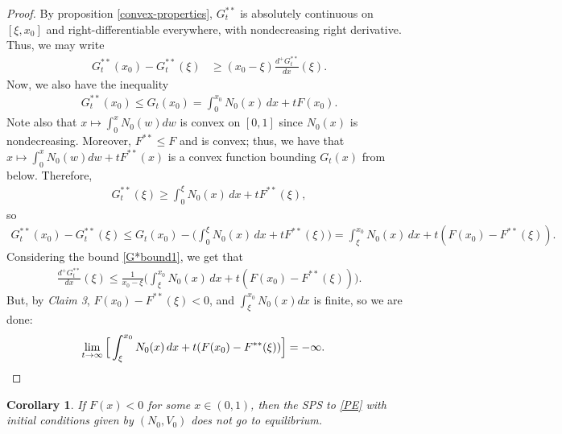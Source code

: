 \documentclass[11pt]{article}
\newtheorem{cor}[thm]{Corollary}
\numberwithin{equation}{section}
\begin{document}
\begin{proof}
    By proposition \ref{convex-properties}, $G_t^{**}$ is absolutely continuous on $[\xi,x_0]$ and right-differentiable everywhere, with nondecreasing right derivative. Thus, we may write
    \begin{align}%
        G_t^{**}(x_0)-G_t^{**}(\xi)&%
        \label{G*bound1}
        \geq%
        (x_0-\xi)\frac{d^+ G_t^{**}}{dx}(\xi).
    \end{align}
    Now, we also have the inequality  
    \begin{align*}
        G_t^{**}(x_0)\leq G_t(x_0)=\int_0^{x_0} N_0(x) \, dx+tF(x_0).
    \end{align*}
    Note also that $x\mapsto\int_0^x N_0(w)dw$ is convex on $[0,1]$ since $N_0(x)$ is nondecreasing. Moreover, $F^{**}\leq F$ and is convex; thus, we have that $x\mapsto\int_0^x N_0(w)dw+tF^{**}(x)$ is a convex function bounding $G_t(x)$ from below. %
    Therefore, 
    \begin{align*}
        G_t^{**}(\xi)\geq\int_0^\xi N_0(x) \, dx+tF^{**}(\xi),
    \end{align*}
    so 
    \begin{align*}
        G_t^{**}(x_0)-G_t^{**}(\xi)\leq G_t(x_0)-\bigg(\int_0^\xi \!\! N_0(x) \, dx+tF^{**}(\xi)\bigg)=\int_\xi^{x_0} \!\! N_0(x) \, dx+t(F(x_0)-F^{**}(\xi)).
    \end{align*}
    Considering the bound \eqref{G*bound1}, we get that 
    \begin{align*}
        \frac{d^+ G_t^{**}}{dx}(\xi)\leq\frac{1}{x_0-\xi}\Big(\int_\xi^{x_0} N_0(x) \, dx+t(F(x_0)-F^{**}(\xi))\Big).
    \end{align*}
    But, by \textit{Claim 3}, $F(x_0)-F^{**}(\xi)<0$, and $\int_\xi^{x_0} N_0(x)dx$ is finite, so we are done: 
    \begin{align*}
        \lim_{t\to\infty}\Big[\int_\xi^{x_0} N_0(x) \, dx+t(F(x_0)-F^{**}(\xi))\Big]&=-\infty. \qedhere
    \end{align*}
\end{proof}

\begin{cor}\label{necessary-cor}
    If $F(x)<0$ for some $x\in (0,1)$, then the SPS to \eqref{PE} with initial conditions given by $(N_0,V_0)$ does not go to equilibrium.
\end{cor}
\end{document}
